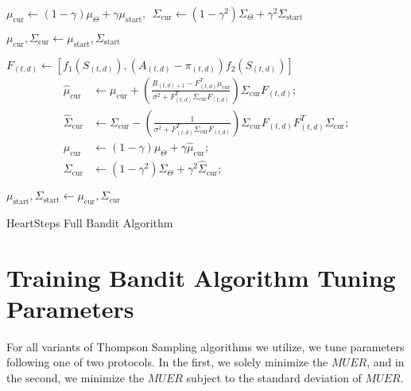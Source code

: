 \begin{algorithm}[!hp]
{{		$\mu_{\text{cur}} \leftarrow (1-\gamma)\mu_\Theta + \gamma \mu_{\text{start}}, \ \ \Sigma_{\text{cur}} \leftarrow (1-\gamma^2) \Sigma_\Theta + \gamma^2 \Sigma_\text{start}$ 
 	}

 	$\mu_{\text{cur}}, \Sigma_{\text{cur}} \leftarrow \mu_{\text{start}}, \Sigma_{\text{start}}$ 
 	 {
 		$F_{(t,d)} \leftarrow \left[f_1(S_{(t,d)}), (A_{(t,d)} - \pi_{(t,d)})f_2(S_{(t,d)}) \right]$ 
 		 \label{Action Centering in Bandit}
 		\begin{align*}
 			\hat{\mu}_\text{cur} &\leftarrow \mu_\text{cur} + \left(\frac{R_{(t,d)+1} - F_{(t,d)}^T \mu_\text{cur}}{\sigma^2 + F_{(t,d)}^T\Sigma_\text{cur}F_{(t,d)}}\right)\Sigma_\text{cur}F_{(t,d)} ;\\
 			\hat{\Sigma}_\text{cur} &\leftarrow \Sigma_\text{cur} - \left(\frac{1}{\sigma^2 +F_{(t,d)}^T \Sigma_\text{cur} F_{(t,d)}}\right)\Sigma_\text{cur} F_{(t,d)} F_{(t,d)}^T \Sigma_\text{cur} ;\\
 			\mu_\text{cur} &\leftarrow (1-\gamma) \mu_\Theta + \gamma \hat{\mu}_\text{cur}; \\
 			\Sigma_\text{cur} &\leftarrow (1-\gamma^2) \Sigma_\Theta + \gamma^2 \hat{\Sigma}_\text{cur};
 		\end{align*} \label{Gaussian Process Update Procedure in Bandit}

 	}

 	$\mu_{\text{start}},\Sigma_{\text{start}} \leftarrow \mu_{\text{cur}},\Sigma_{\text{cur}}$ 

 }
 \caption{HeartSteps Full Bandit Algorithm}
 \label{HeartSteps Full Bandit Algorithm}
\end{algorithm}

\clearpage


\newpage

\section{Training Bandit Algorithm Tuning Parameters}

For all variants of Thompson Sampling algorithms we utilize, we tune parameters following one of two protocols.  In the first, we solely minimize the $MUER$, and in the second, we minimize the $MUER$ subject to the standard deviation of $MUER$.

